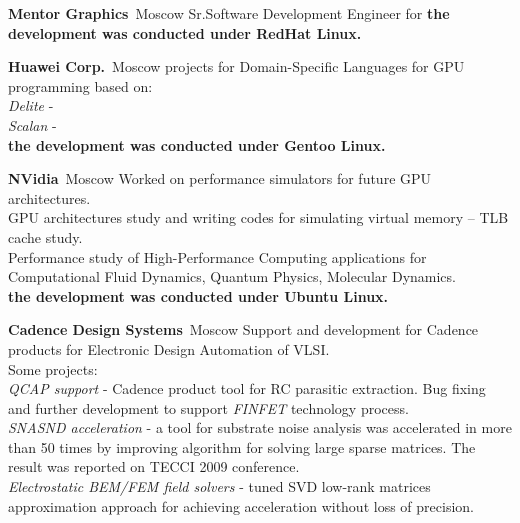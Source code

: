 \documentclass[11pt,a4paper,roman]{moderncv}
\begin{document}
    {{\bfseries{Mentor Graphics}}\ }{Moscow}{}{
  Sr.Software Development Engineer for 
  \bfseries{the development was conducted under RedHat Linux}.
}

    {{\bfseries{Huawei Corp.}}\ }{Moscow}{}{
  projects for Domain-Specific Languages for GPU programming based on: \\
  \emph{Delite} -  \\
  \emph{Scalan} -  \\
  \bfseries{the development was conducted under Gentoo Linux}.
}

    {{\bfseries{NVidia}}\ }{Moscow}{}{
  Worked on performance simulators for future GPU architectures. \\
  GPU architectures study and writing codes for simulating virtual memory -- TLB cache study. \\
  Performance study of High-Performance Computing applications for Computational Fluid Dynamics, Quantum Physics, Molecular Dynamics. \\
  \bfseries{the development was conducted under Ubuntu Linux}.
}

    {{\bfseries{Cadence Design Systems}}\ }{Moscow}{}{
  Support and development for Cadence products for Electronic Design Automation of VLSI. \\
  Some projects: \\
  \emph{QCAP support} - Cadence product tool for RC parasitic extraction. Bug fixing and further development to support {\em{FINFET}} technology process. \\
  \emph{SNASND acceleration} - a tool for substrate noise analysis was accelerated in more than 50 times by improving algorithm for solving large sparse matrices. The result was reported on TECCI 2009 conference. \\
  \emph{Electrostatic BEM/FEM field solvers} - tuned SVD low-rank matrices approximation approach for achieving acceleration without loss of precision. \\
}
\end{document}
